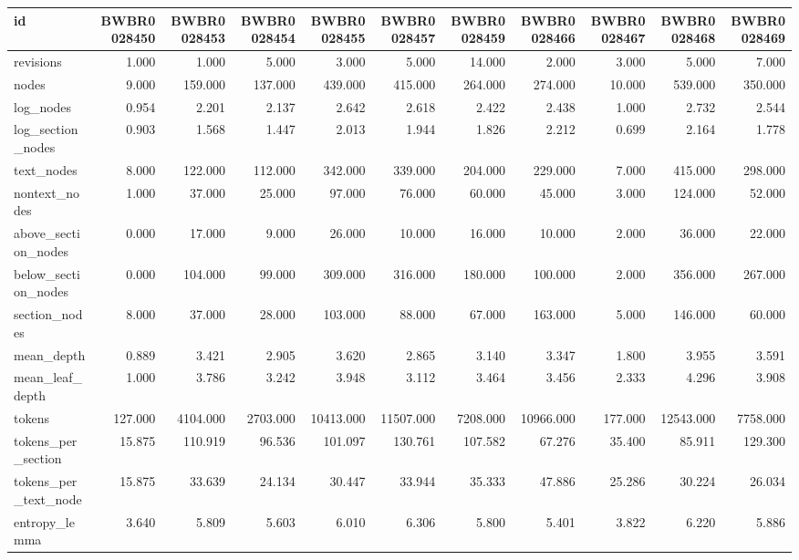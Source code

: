 \begin{tabular}{lrrrrrrrrrr}
\toprule
id & BWBR0028450 & BWBR0028453 & BWBR0028454 & BWBR0028455 & BWBR0028457 & BWBR0028459 & BWBR0028466 & BWBR0028467 & BWBR0028468 & BWBR0028469 \\
\midrule
revisions & 1.000 & 1.000 & 5.000 & 3.000 & 5.000 & 14.000 & 2.000 & 3.000 & 5.000 & 7.000 \\
\cline{1-11}
nodes & 9.000 & 159.000 & 137.000 & 439.000 & 415.000 & 264.000 & 274.000 & 10.000 & 539.000 & 350.000 \\
\cline{1-11}
log\_nodes & 0.954 & 2.201 & 2.137 & 2.642 & 2.618 & 2.422 & 2.438 & 1.000 & 2.732 & 2.544 \\
\cline{1-11}
log\_section\_nodes & 0.903 & 1.568 & 1.447 & 2.013 & 1.944 & 1.826 & 2.212 & 0.699 & 2.164 & 1.778 \\
\cline{1-11}
text\_nodes & 8.000 & 122.000 & 112.000 & 342.000 & 339.000 & 204.000 & 229.000 & 7.000 & 415.000 & 298.000 \\
\cline{1-11}
nontext\_nodes & 1.000 & 37.000 & 25.000 & 97.000 & 76.000 & 60.000 & 45.000 & 3.000 & 124.000 & 52.000 \\
\cline{1-11}
above\_section\_nodes & 0.000 & 17.000 & 9.000 & 26.000 & 10.000 & 16.000 & 10.000 & 2.000 & 36.000 & 22.000 \\
\cline{1-11}
below\_section\_nodes & 0.000 & 104.000 & 99.000 & 309.000 & 316.000 & 180.000 & 100.000 & 2.000 & 356.000 & 267.000 \\
\cline{1-11}
section\_nodes & 8.000 & 37.000 & 28.000 & 103.000 & 88.000 & 67.000 & 163.000 & 5.000 & 146.000 & 60.000 \\
\cline{1-11}
mean\_depth & 0.889 & 3.421 & 2.905 & 3.620 & 2.865 & 3.140 & 3.347 & 1.800 & 3.955 & 3.591 \\
\cline{1-11}
mean\_leaf\_depth & 1.000 & 3.786 & 3.242 & 3.948 & 3.112 & 3.464 & 3.456 & 2.333 & 4.296 & 3.908 \\
\cline{1-11}
tokens & 127.000 & 4104.000 & 2703.000 & 10413.000 & 11507.000 & 7208.000 & 10966.000 & 177.000 & 12543.000 & 7758.000 \\
\cline{1-11}
tokens\_per\_section & 15.875 & 110.919 & 96.536 & 101.097 & 130.761 & 107.582 & 67.276 & 35.400 & 85.911 & 129.300 \\
\cline{1-11}
tokens\_per\_text\_node & 15.875 & 33.639 & 24.134 & 30.447 & 33.944 & 35.333 & 47.886 & 25.286 & 30.224 & 26.034 \\
\cline{1-11}
entropy\_lemma & 3.640 & 5.809 & 5.603 & 6.010 & 6.306 & 5.800 & 5.401 & 3.822 & 6.220 & 5.886 \\

\end{tabular}

